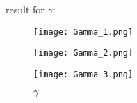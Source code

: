 ﻿\documentclass[a4paper, 11pt]{article}
\numberwithin{equation}{subsection}
\begin{document}
\noindent result for $\gamma$:
\begin{figure}[h]
\centering
\begin{minipage}[t]{0.48\textwidth}
\centering
\texttt{[image: Gamma\_1.png]}
\caption{$\gamma$}
\end{minipage}
\begin{minipage}[t]{0.48\textwidth}
\centering
\texttt{[image: Gamma\_2.png]}
\caption{$\gamma$}
\end{minipage}
\begin{minipage}[t]{0.48\textwidth}
\centering
\texttt{[image: Gamma\_3.png]}
\caption{$\gamma$}
\end{minipage}
\end{figure}



%
%
\end{document}
